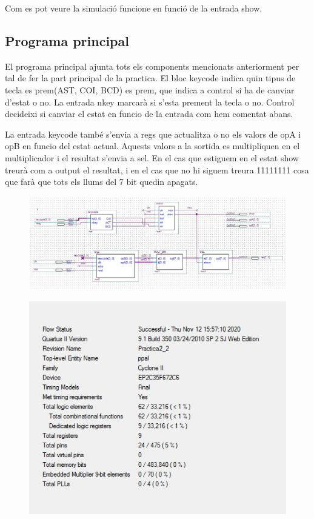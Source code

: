 \documentclass[12pt, a4papre]{article}
\begin{document}
	Com es pot veure la simulació funcione en funció de la entrada show.
	\subsection{Programa principal}
	
	El programa principal ajunta tots els components mencionats anteriorment per tal de fer la part principal de la practica. El bloc keycode indica quin tipus de tecla es prem(AST, COI, BCD) es prem, que indica a control si ha de canviar d'estat o no. La entrada nkey marcarà si s'esta prement la tecla o no. Control decideixi si canviar el estat en funcio de la entrada com hem comentat abans. 
	
	La entrada keycode també s'envia a regs que actualitza o no els valors de opA i opB en funcio del estat actual. Aquests valors a la sortida es multipliquen en el multiplicador i el resultat s'envia a sel. En el cas que estiguem en el estat show treurà com a output el resultat, i en el cas que no hi siguem treura 11111111 cosa que farà que tots els llums del 7 bit quedin apagats.
	
	\begin{figure}[H]
		\begin{center}
		\includegraphics[width=130mm]{ppal.jpeg}
		\end{center}
	\end{figure}
	
	\begin{figure}[H]
		\begin{center}
		\includegraphics[width=130mm]{informePpal.jpeg}
		\end{center}
	\end{figure}
	
\end{document}
